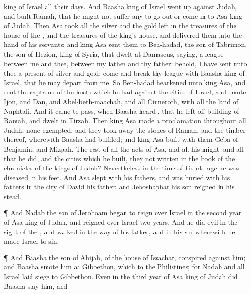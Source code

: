 {king of
Israel all their
days.
And
Baasha
king of
Israel went
up against
Judah, and
built
Ramah, that he might not
suffer any to go
out or come
in to
Asa
king of
Judah.
Then
Asa
took all the
silver and the
gold
{}
left in the
treasures of the
house of the
{}, and the
treasures of the
king’s
house, and
delivered them into the
hand of his
servants: and
king
Asa
sent them to
Ben-hadad, the
son of
Tabrimon, the
son of
Hezion,
king of
Syria, that
dwelt at
Damascus,
saying,
 a
league between me and thee,
{} between my
father and thy
father: behold, I have
sent unto thee a
present of
silver and
gold;
come and
break thy
league with
Baasha
king of
Israel, that he may
depart from me.
So
Ben-hadad
hearkened unto
king
Asa, and
sent the
captains of the
hosts which he had against the
cities of
Israel, and
smote
Ijon, and
Dan, and
Abel-beth-maachah, and all
Cinneroth, with all the
land of
Naphtali.
And it came to pass, when
Baasha
heard
{}, that he left
off
building of
Ramah, and
dwelt in
Tirzah.
Then
king
Asa made a
proclamation throughout all
Judah; none
{}
exempted: and they
took away the
stones of
Ramah, and the
timber thereof, wherewith
Baasha had
builded; and
king
Asa
built with them
Geba of
Benjamin, and
Mizpah.
The
rest of all the
acts of
Asa, and all his
might, and all that he
did, and the
cities which he
built,
{} they not
written in the
book of the
chronicles of the
kings of
Judah? Nevertheless in the
time of his old
age he was
diseased in his
feet.
And
Asa
slept with his
fathers, and was
buried with his
fathers in the
city of
David his
father: and
Jehoshaphat his
son
reigned in his stead.
\par }{\PP {}¶ And
Nadab the
son of
Jeroboam began to
reign over
Israel in the
second
year of
Asa
king of
Judah, and
reigned over
Israel
two
years.
And he
did
evil in the
sight of the
{}, and
walked in the
way of his
father, and in his
sin wherewith he made
Israel to
sin.
\par }{\PP {}¶ And
Baasha the
son of
Ahijah, of the
house of
Issachar,
conspired against him; and
Baasha
smote him at
Gibbethon, which
{} to the
Philistines; for
Nadab and all
Israel laid
siege to
Gibbethon.
Even in the
third
year of
Asa
king of
Judah did
Baasha
slay him, and
}
